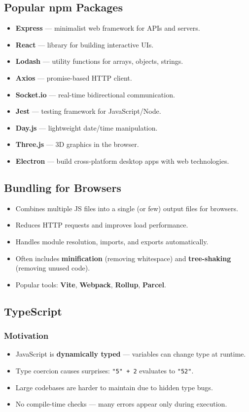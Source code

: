 \documentclass[hidelinks]{article}
\begin{document}
\subsection{Popular npm Packages}
\begin{itemize}
  \item \textbf{Express} --- minimalist web framework for APIs and servers.
  \item \textbf{React} --- library for building interactive UIs.
  \item \textbf{Lodash} --- utility functions for arrays, objects, strings.
  \item \textbf{Axios} --- promise-based HTTP client.
  \item \textbf{Socket.io} --- real-time bidirectional communication.
  \item \textbf{Jest} --- testing framework for JavaScript/Node.
  \item \textbf{Day.js} --- lightweight date/time manipulation.
  \item \textbf{Three.js} --- 3D graphics in the browser.
  \item \textbf{Electron} --- build cross-platform desktop apps with web technologies.
\end{itemize}

\subsection{Bundling for Browsers}
\begin{itemize}
  \item Combines multiple JS files into a single (or few) output files for browsers.
  \item Reduces HTTP requests and improves load performance.
  \item Handles module resolution, imports, and exports automatically.
  \item Often includes \textbf{minification} (removing whitespace) and \textbf{tree-shaking} (removing unused code).
  \item Popular tools: \textbf{Vite}, \textbf{Webpack}, \textbf{Rollup}, \textbf{Parcel}.
\end{itemize}

\subsection{TypeScript}
\subsubsection{Motivation}
\begin{itemize}
  \item JavaScript is \textbf{dynamically typed} --- variables can change type at runtime.
  \item Type coercion causes surprises: \texttt{"5" + 2} evaluates to \texttt{"52"}.
  \item Large codebases are harder to maintain due to hidden type bugs.
  \item No compile-time checks --- many errors appear only during execution.
\end{itemize}
\end{document}
